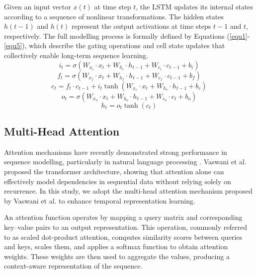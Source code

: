 \documentclass[a4paper,fleqn]{cas-sc}
\begin{document}
Given an input vector $x(t)$ at time step $t$, the LSTM updates its internal states according to a sequence of nonlinear transformations. The hidden states $h(t-1)$ and $h(t)$ represent the output activations at time steps $t-1$ and $t$, respectively. The full modelling process is formally defined by Equations (\ref{equ1}-\ref{equ5}), which describe the gating operations and cell state updates that collectively enable long-term sequence learning.
\begin{equation}
i_t = \sigma \left( W_{x_i} \cdot x_t + W_{h_i} \cdot h_{t-1} + W_{c_i} \cdot c_{t-1} + b_i\right)
\label{equ1}
\end{equation}
\begin{equation}
f_t = \sigma\left(W_{x_f} \cdot x_t + W_{h_f} \cdot h_{t-1} + W_{c_f} \cdot c_{t-1} + b_f\right)
\label{equ2}
\end{equation}
\begin{equation}
c_t = f_t \cdot c_{t-1} + i_t \tanh\left(W_{x_c} \cdot x_t + W_{h_c} \cdot h_{t-1} + b_c\right)
\label{equ3}
\end{equation}
\begin{equation}
o_t = \sigma\left(W_{x_o} \cdot x_t + W_{h_o} \cdot h_{t-1} + W_{c_o} \cdot c_t + b_o\right)
\label{equ4}
\end{equation}
\begin{equation}
h_t = o_t \tanh\left(c_t\right)
\label{equ5}
\end{equation}

\subsection{Multi-Head Attention}

Attention mechanisms have recently demonstrated strong performance in sequence modelling, particularly in natural language processing \cite{abbasimehr2022improving}. Vaswani et al. \cite{vaswani2017attention} proposed the transformer architecture, showing that attention alone can effectively model dependencies in sequential data without relying solely on recurrence. In this study, we adopt the multi-head attention mechanism proposed by Vaswani et al. to enhance temporal representation learning.

An attention function operates by mapping a query matrix and corresponding key–value pairs to an output representation. This operation, commonly referred to as scaled dot-product attention, computes similarity scores between queries and keys, scales them, and applies a softmax function to obtain attention weights. These weights are then used to aggregate the values, producing a context-aware representation of the sequence.
\end{document}
